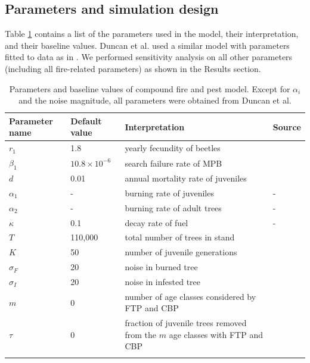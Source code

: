 \subsection{Parameters and simulation design}

Table \ref{params} contains a list of the parameters used in the model, their interpretation, and their baseline values. Duncan et al. used a similar model with parameters fitted to data as in \cite{agne2016fire}. We performed sensitivity analysis on all other parameters (including all fire-related parameters) as shown in the Results section.

\begin{table}

\centering
\caption[Parameters and baseline values of compound fire and pest model.]{Parameters and baseline values of compound fire and pest model. Except for $\alpha_i$ and the noise magnitude, all parameters were obtained from Duncan et al. \cite{duncan2015model}}

\begin{tabular}{l l p{5cm} l}
\hline\noalign{\smallskip}
  Parameter name & Default value & Interpretation & Source \\
\hline\noalign{\smallskip}
  $r_1$ & 1.8  & yearly fecundity of beetles & \cite{powell2009connecting}  \\
  $\beta_1$ & $10.8 \times 10^{-6}$  & search failure rate of MPB & \cite{powell2009connecting}   \\
  $d$ & 0.01  & annual mortality rate of juveniles & \cite{duncan2015model}  \\
  $\alpha_1$& - & burning rate of juveniles & - \\
  $\alpha_2$& - & burning rate of adult trees & - \\
  $\kappa$& 0.1 & decay rate of fuel & - \\
  $T$ & 110,000 & total number of trees in stand & \cite{powell2009connecting} \\
  $K$ & 50 & number of juvenile generations & \cite{duncan2015model} \\
  $\sigma_F$ & 20 & noise in burned tree\\
  $\sigma_I$ & 20 & noise in infested tree\\
  $m$ & 0 & number of age classes considered by FTP and CBP\\
  $\tau$ & 0 & fraction of juvenile trees removed from the $m$  age classes with FTP and CBP\\

\hline\noalign{\smallskip}
\end{tabular}
 \protect \label{params}
\end{table}
\normalsize

